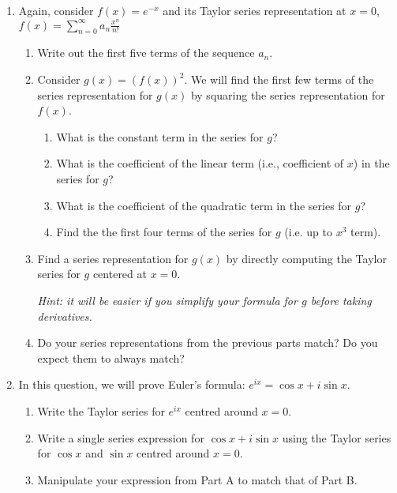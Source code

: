 \begin{enumerate}
    \item Again, consider $f(x)=e^{-x}$ and its Taylor series representation at $x=0$,
    $\displaystyle f(x)= \sum_{n=0}^\infty a_n \frac{x^n}{n!}$
    \begin{enumerate}
        \item Write out the first five terms of the sequence $a_n$.
        \item Consider $g(x)=(f(x))^2$.  We will find the first few terms of the series representation for $g(x)$ by squaring the series representation for $f(x)$. 
        \begin{enumerate}
            \item What is the constant term in the series for $g$?
            \item What is the coefficient of the linear term (i.e., coefficient of $x$) in the series for $g$?
            \item What is the coefficient of the quadratic term in the series for $g$?
            \item Find the the first four terms of the series for $g$ (i.e. up to $x^3$ term).
        \end{enumerate}
        \item Find a series representation for $g(x)$ by directly computing the Taylor series for $g$ centered at $x=0$.

        \emph{Hint: it will be easier if you simplify your formula for $g$ before taking derivatives.}
        \item Do your series representations from the previous parts match? Do you expect them to always match?
    \end{enumerate}

	\item In this question, we will prove Euler's formula: $e^{ix} = \cos{x} + i\sin{x}$.
    \begin{enumerate}
        \item Write the Taylor series for $e^{ix}$ centred around $x=0$.
        \item Write a single series expression for $\cos{x} + i\sin{x}$ using the Taylor series for $\cos{x}$ and $\sin{x}$ centred around $x=0$.
        \item Manipulate your expression from Part A to match that of Part B.
    \end{enumerate}

\begin{comment}

    e^-x prove that for fixed x, it converges 
Do another with ratio test, finite ratio; for a fixed x, will it converge?
Show x^n/n! works for |x| < 1 


\end{comment}
\end{enumerate}
